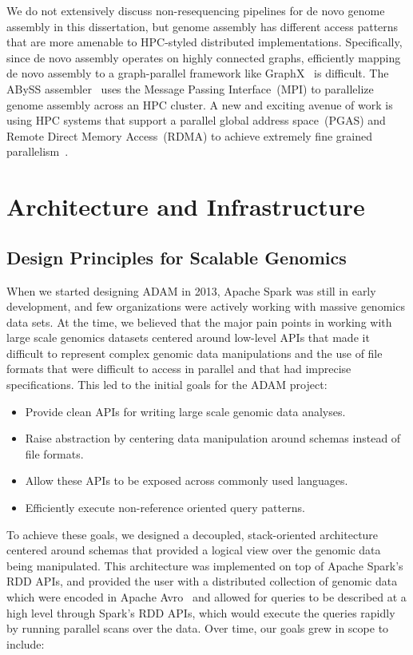 \documentclass[phd]{ucbthesis}
\begin{document}
We do not extensively discuss non-resequencing pipelines for de novo genome
assembly in this dissertation, but genome assembly has different access patterns
that are more amenable to HPC-styled distributed implementations. Specifically,
since de novo assembly operates on highly connected graphs, efficiently mapping
de novo assembly to a graph-parallel framework like
{GraphX}~\cite{gonzalez14} is difficult. The {ABySS}
assembler~\cite{simpson09} uses the Message Passing Interface~(MPI) to
parallelize genome assembly across an HPC cluster. A new and exciting avenue
of work is using HPC systems that support a parallel global address space~(PGAS)
and Remote Direct Memory Access~(RDMA) to achieve extremely fine grained
parallelism~\cite{georganas14, georganas15hipmer, georganas15meraligner,
  georganas17}.

\part{Architecture and Infrastructure}

\chapter{Design Principles for Scalable Genomics}
\label{chap:design}

When we started designing {ADAM} in 2013, {Apache Spark} was still
in early development, and few organizations were actively working with massive
genomics data sets. At the time, we believed that the major pain points in
working with large scale genomics datasets centered around low-level APIs that
made it difficult to represent complex genomic data manipulations and the use of
file formats that were difficult to access in parallel and that had imprecise
specifications. This led to the initial goals for the {ADAM} project:

\begin{itemize}
\item Provide clean APIs for writing large scale genomic data analyses.
\item Raise abstraction by centering data manipulation around schemas instead
  of file formats.
\item Allow these APIs to be exposed across commonly used languages.
\item Efficiently execute non-reference oriented query patterns.
\end{itemize}

To achieve these goals, we designed a decoupled, stack-oriented architecture
centered around schemas that provided a logical view over the genomic
data being manipulated. This architecture was implemented on top of
{Apache Spark}'s RDD APIs, and provided the user with a distributed
collection of genomic data which were encoded in {Apache
  Avro}~\cite{avro} and allowed for queries to be described at a high level
through {Spark}'s RDD APIs, which would execute the queries rapidly by
running parallel scans over the data. Over time, our goals grew in scope to
include:
\end{document}
